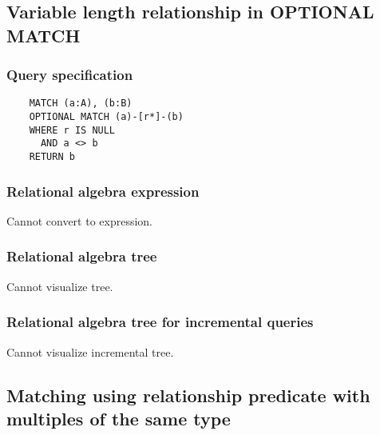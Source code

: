	\subsection{Variable length relationship in OPTIONAL MATCH}

	\subsubsection*{Query specification}

	\begin{lstlisting}
	MATCH (a:A), (b:B)
	OPTIONAL MATCH (a)-[r*]-(b)
	WHERE r IS NULL
	  AND a <> b
	RETURN b
	\end{lstlisting}


	\subsubsection*{Relational algebra expression}

	Cannot convert to expression.

	\subsubsection*{Relational algebra tree}

	Cannot visualize tree.

	\subsubsection*{Relational algebra tree for incremental queries}

	Cannot visualize incremental tree.
	\subsection{Matching using relationship predicate with multiples of the same type}

